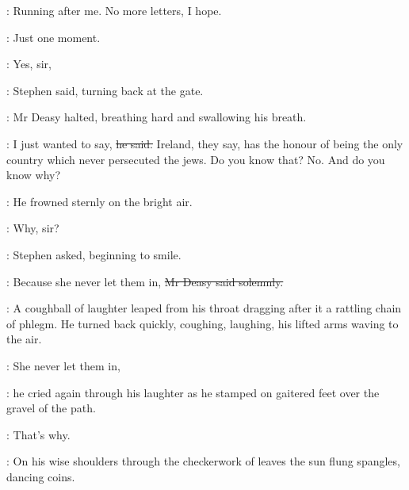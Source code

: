 \StephenInt:
Running after me.
No more letters, I hope.

\deasy:
Just one moment.

\Stephen:
Yes, sir,

:
Stephen said, turning back at the gate.

:
Mr Deasy halted, breathing hard and swallowing his breath.

\deasy:
I just wanted to say, \sout{he said.}
Ireland, they say, has the honour of being the only country
which never persecuted the jews.
Do you know that?
No.
And do you know why?

:
He frowned sternly on the bright air.

\Stephen:
Why, sir?

:
Stephen asked, beginning to smile.

\deasy:
Because she never let them in,
\sout{Mr Deasy said solemnly.}

:
A coughball of laughter leaped from his throat
dragging after it a rattling chain of phlegm.
He turned back quickly, coughing, laughing,
his lifted arms waving to the air.

\deasy:
She never let them in,

:
he cried again through his laughter
as he stamped on gaitered feet over the gravel of the path.

\deasy:
That's why.

:
On his wise shoulders through the checkerwork of leaves
the sun flung spangles, dancing coins.



